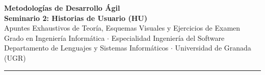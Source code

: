 \documentclass[11pt,a4paper,twoside,openany]{report}
\begin{document}
\begin{titlepage}
    \centering
    \vspace*{1.2cm}
    
    {\Huge\bfseries\color{mdaDarkBlue}\textsf{Metodologías de Desarrollo Ágil}}\\[0.5cm]
    {\LARGE\bfseries\color{mdaPrimary}\textsf{Seminario 2: Historias de Usuario (HU)}}\\[0.4cm]
    {\Large\textsf{Apuntes Exhaustivos de Teoría, Esquemas Visuales y Ejercicios de Examen}}\\[0.4cm]
    {\large\textsf{Grado en Ingeniería Informática $\cdot$ Especialidad Ingeniería del Software}}\\[0.2cm]
    {\normalsize\textsf{Departamento de Lenguajes y Sistemas Informáticos $\cdot$ Universidad de Granada (UGR)}}\\[1.2cm]
    
    \rule{0.88\textwidth}{1.5pt}\\[1.5cm]
    

\end{titlepage}
\end{document}
